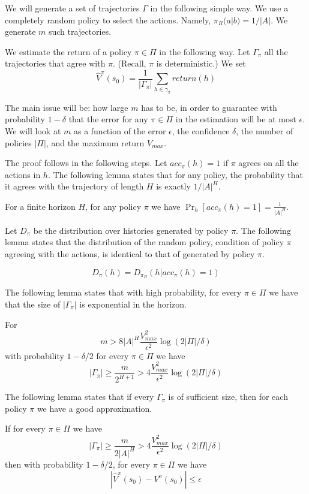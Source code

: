 We will generate a set of trajectories $\Gamma$ in the following
simple way. We use a completely random policy to select the actions.
Namely, $\pi_R(a|b)=1/|A|$. We generate $m$ such trajectories.

We estimate the return of a policy $\pi\in \Pi$ in the following
way. Let $\Gamma_\pi$ all the trajectories that agree with $\pi$.
(Recall, $\pi$ is deterministic.) We set
\[
\hat{V}^\pi(s_0)=\frac{1}{|\Gamma_\pi|}\sum_{h\in \gamma_\pi}
return(h)
\]

The main issue will be: how large $m$ has to be, in order to
guarantee with probability $1-\delta$ that the error for any $\pi\in
\Pi$ in the estimation will be at most $\epsilon$. We will look at
$m$ as a function of the error $\epsilon$, the confidence $\delta$,
the number of policies $|\Pi|$, and the maximum return $V_{max}$.

The proof follows in the following steps. Let $acc_\pi(h)=1$ if
$\pi$ agrees on all the actions in $h$. The following lemma states
that for any policy, the probability that it agrees with the
trajectory of length $H$ is exactly $1/|A|^H$.
\begin{lemma}
For a finite horizon $H$, for any policy $\pi$ we have
$\Pr_h[acc_\pi(h)=1]=\frac{1}{|A|^H}$.
\end{lemma}

Let $D_\pi$ be the distribution over histories generated by policy
$\pi$. The following lemma states that the distribution of the
random policy, condition of policy $\pi$ agreeing with the actions,
is identical to that of generated by policy $\pi$.
\begin{lemma}
\[
D_\pi(h)=D_{\pi_R}(h|acc_\pi(h)=1)
\]
\end{lemma}

The following lemma states that with high probability, for every
$\pi\in \Pi$ we have that the size of $|\Gamma_\pi|$ is exponential
in the horizon.
\begin{lemma}
For
\[
m> 8|A|^{H}\frac{V^2_{max}}{\epsilon^2}\log(2|\Pi|/\delta)
\]
with probability $1-\delta/2$ for every $\pi\in \Pi$ we have
\[
|\Gamma_\pi|\geq \frac{m}{2^{H+1}}>
4\frac{V^2_{max}}{\epsilon^2}\log(2|\Pi|/\delta)
\]
\end{lemma}

The following lemma states that if every $\Gamma_\pi$ is of
sufficient size, then for each policy $\pi$ we have a good
approximation.
\begin{lemma}
If for every $\pi\in \Pi$ we have
\[
|\Gamma_\pi|\geq \frac{m}{2|A|^{H}}> 4
\frac{V^2_{max}}{\epsilon^2}\log(2|\Pi|/\delta)
\]
then with probability $1-\delta/2$, for every $\pi\in \Pi$ we have
\[
|\hat{V}^\pi (s_0)-V^\pi(s_0)|\leq \epsilon
\]
\end{lemma}


